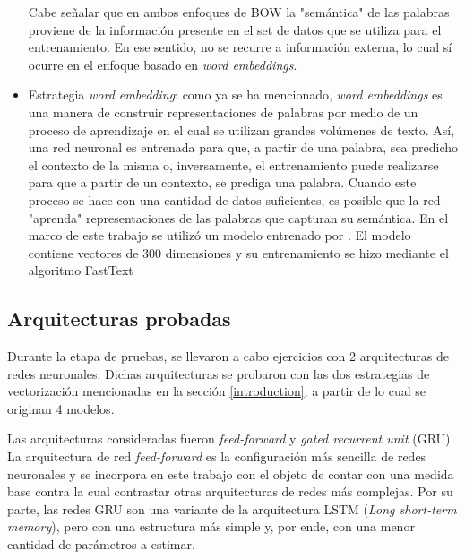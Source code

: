 \documentclass[
  12pt,
  spanish,
]{article}
\begin{document}
\begin{itemize}
\newline
\newline Cabe señalar que en ambos enfoques de BOW la "semántica" de las palabras proviene de la información presente en el set de datos que se utiliza para el entrenamiento. En ese sentido, no se recurre a información externa, lo cual sí ocurre en el enfoque basado en \textit{word embeddings}. 

  \item Estrategia \textit{word embedding}: como ya se ha mencionado, \textit{word embeddings} es una manera de construir representaciones de palabras por medio de un proceso de aprendizaje en el cual se utilizan grandes volúmenes de texto. Así, una red neuronal es entrenada para que, a partir de una palabra, sea predicho el contexto de la misma o, inversamente, el entrenamiento puede realizarse para que a partir de un contexto, se prediga una palabra. Cuando este proceso se hace con una cantidad de datos suficientes, es posible que la red "aprenda" representaciones de las palabras que capturan su semántica. En el marco de este trabajo se utilizó un modelo entrenado por \href{https://github.com/dccuchile/spanish-word-embeddings/blob/master/emb-from-suc.md}{\color{blue}{Jorge Pérez y José Cañete}}. El modelo contiene vectores de 300 dimensiones y su entrenamiento se hizo mediante el algoritmo FastText  
\end{itemize}

\hypertarget{arquitecturas-probadas}{%
\subsection{Arquitecturas probadas}\label{arquitecturas-probadas}}

Durante la etapa de pruebas, se llevaron a cabo ejercicios con 2
arquitecturas de redes neuronales. Dichas arquitecturas se probaron con
las dos estrategias de vectorización mencionadas en la sección
\ref{introduction}, a partir de lo cual se originan 4 modelos.

Las arquitecturas consideradas fueron \emph{feed-forward} y \emph{gated
recurrent unit} (GRU). La arquitectura de red \emph{feed-forward} es la
configuración más sencilla de redes neuronales y se incorpora en este
trabajo con el objeto de contar con una medida base contra la cual
contrastar otras arquitecturas de redes más complejas. Por su parte, las
redes GRU son una variante de la arquitectura LSTM (\emph{Long
short-term memory}), pero con una estructura más simple y, por ende, con
una menor cantidad de parámetros a estimar.
\end{document}
